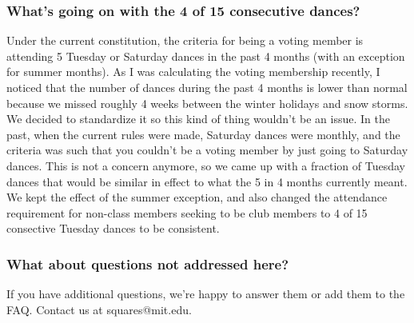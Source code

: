 \documentclass{article}
\begin{document}
\subsubsection*{What's going on with the 4 of 15 consecutive dances?}
Under the current constitution, the criteria for being a voting member is attending 5 Tuesday or Saturday dances in the past 4 months (with an exception for summer months). As I was calculating the voting membership recently, I noticed that the number of dances during the past 4 months is lower than normal because we missed roughly 4 weeks between the winter holidays and snow storms. We decided to standardize it so this kind of thing wouldn't be an issue. In the past, when the current rules were made, Saturday dances were monthly, and the criteria was such that you couldn't be a voting member by just going to Saturday dances. This is not a concern anymore, so we came up with a fraction of Tuesday dances that would be similar in effect to what the 5 in 4 months currently meant. We kept the effect of the summer exception, and also changed the attendance requirement for non-class members seeking to be club members to 4 of 15 consective Tuesday dances to be consistent.

\subsubsection*{What about questions not addressed here?}
If you have additional questions, we're happy to answer them or add them to the FAQ. Contact us at squares@mit.edu.
\end{document}
